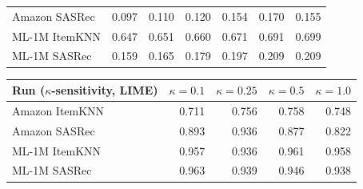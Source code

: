 \begin{table}[t]
\begin{tabular}{@{}lrrrrrr@{}}
Amazon SASRec & 0.097 & 0.110 & 0.120 & 0.154 & 0.170 & 0.155 \\
ML-1M ItemKNN & 0.647 & 0.651 & 0.660 & 0.671 & 0.691 & 0.699 \\
ML-1M SASRec & 0.159 & 0.165 & 0.179 & 0.197 & 0.209 & 0.209 \\
\bottomrule
\end{tabular}
\par\vspace{2mm}
\begin{tabular}{@{}lrrrr@{}}
\toprule
Run ($\kappa$-sensitivity, LIME) & $\kappa=0.1$ & $\kappa=0.25$ & $\kappa=0.5$ & $\kappa=1.0$ \\
\midrule
Amazon ItemKNN & 0.711 & 0.756 & 0.758 & 0.748 \\
Amazon SASRec & 0.893 & 0.936 & 0.877 & 0.822 \\
ML-1M ItemKNN & 0.957 & 0.936 & 0.961 & 0.958 \\
ML-1M SASRec & 0.963 & 0.939 & 0.946 & 0.938 \\
\bottomrule
\end{tabular}
\end{table}
